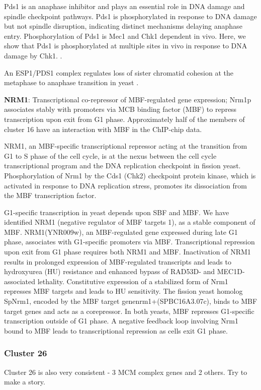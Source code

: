 \documentclass[]{article}
\begin{document}
Pds1 is an anaphase inhibitor and plays an essential role in DNA damage and spindle checkpoint pathways. Pds1 is phosphorylated in response to DNA damage but not spindle disruption, indicating distinct mechanisms delaying anaphase entry. Phosphorylation of Pds1 is Mec1 and Chk1 dependent in vivo. Here, we show that Pds1 is phosphorylated at multiple sites in vivo in response to DNA damage by Chk1. \cite{wang2001pds1}.

An ESP1/PDS1 complex regulates loss of sister chromatid cohesion at the metaphase to anaphase transition in yeast \citep{ciosk1998esp1}.

\textbf{NRM1}: Transcriptional co-repressor of MBF-regulated gene expression; Nrm1p associates stably with promoters via MCB binding factor (MBF) to repress transcription upon exit from G1 phase. Approximately half of the members of cluster 16 have an interaction with MBF in the ChIP-chip data.

NRM1, an MBF-specific transcriptional repressor acting at the transition from G1 to S phase of the cell cycle, is at the nexus between the cell cycle transcriptional program and the DNA replication checkpoint in fission yeast. Phosphorylation of Nrm1 by the Cds1 (Chk2) checkpoint protein kinase, which is activated in response to DNA replication stress, promotes its dissociation from the MBF transcription factor. \cite{de2008dna}

G1-specific transcription in yeast depends upon SBF and MBF. We have identified NRM1 (negative regulator of MBF targets 1), as a stable component of MBF. NRM1(YNR009w), an MBF-regulated gene expressed during late G1 phase, associates with G1-specific promoters via MBF. Transcriptional repression upon exit from G1 phase requires both NRM1 and MBF. Inactivation of NRM1 results in prolonged expression of MBF-regulated transcripts and leads to hydroxyurea (HU) resistance and enhanced bypass of RAD53D- and MEC1D-associated lethality. Constitutive expression of a stabilized form of Nrm1 represses MBF targets and leads to HU sensitivity. The fission yeast homolog SpNrm1, encoded by the MBF target genenrm1+(SPBC16A3.07c), binds to MBF target genes and acts as a corepressor. In both yeasts, MBF represses G1-specific transcription outside of G1 phase. A negative feedback loop involving Nrm1 bound to MBF leads to transcriptional repression as cells exit G1 phase. \citep{de2006constraining}

\subsubsection{Cluster 26}
Cluster 26 is also very consistent - 3 MCM complex genes and 2 others. Try to make a story.
\end{document}
